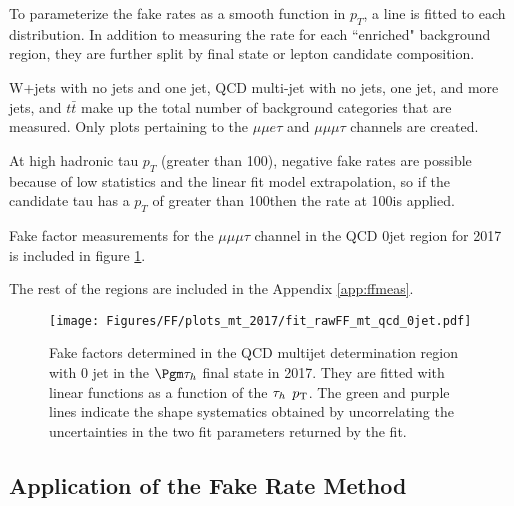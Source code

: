 To parameterize the fake rates as a smooth function in $p_T$, a line is fitted to each distribution. 
In addition to measuring the rate for each ``enriched" background region, they are further split by final state or lepton candidate composition. 

W+jets with no jets and one jet, QCD multi-jet with no jets, one jet, and more jets, and $t\bar{t}$ make up the total number of background categories that are measured. Only plots pertaining to the $\mu\mu e \tau$ and $\mu\mu \mu \tau$ channels are created. 

At high hadronic tau $p_T$ (greater than 100\GeV), negative fake rates are possible because of low statistics and the linear fit model extrapolation, so if the candidate tau has a $p_T$ of greater than 100\GeV then the rate at 100\GeV is applied. 




Fake factor measurements for the $\mu\mu\mu\tau$ channel in the QCD 0jet region for 2017 is included in figure \ref{fig:fit_raw_mt_0jet_qcd}. 

The rest of the regions are included in the Appendix \ref{app:ffmeas}.




\begin{figure}[ht!b]
\centering
\texttt{[image: Figures/FF/plots\_mt\_2017/fit\_rawFF\_mt\_qcd\_0jet.pdf]}\\
\caption{\label{fig:fit_raw_mt_0jet_qcd} Fake factors determined in the QCD multijet determination region with 0 jet in the $\Pgm\tauh$ final state in 2017. They are fitted with linear functions as a function of the $\tau_h$ $p_{\mathrm{T}}$. The green and purple lines indicate the shape systematics obtained by uncorrelating the uncertainties in the two fit parameters returned by the fit.  }
\end{figure}





\clearpage

\subsection{Application of the Fake Rate Method}

